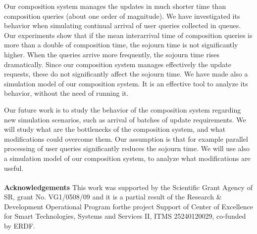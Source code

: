 \documentclass[10pt]{llncs}
\begin{document}
 Our composition system manages the updates in much shorter time than composition queries (about one order of magnitude). We have investigated its behavior when simulating continual arrival of user queries collected in queues. Our experiments show that if the mean interarrival time of composition queries is more than a double of composition time, the sojourn time is not signiﬁcantly higher. When the queries arrive more frequently, the sojourn time rises dramatically. Since our composition system manages effectively the update requests, these do not signiﬁcantly affect the sojourn time. We have made also a simulation model of our composition system. It is an effective tool to analyze its behavior, without the need of running it. 

Our future work is to study the behavior of the composition system regarding new simulation scenarios, such as arrival of batches of update requirements. We will study what are the bottlenecks of the composition system, and what modiﬁcations could overcome them. Our assumption is that for example parallel processing of user queries signiﬁcantly reduces the sojourn time. We will use also a simulation model of our composition system, to analyze what modiﬁcations are useful.
\\
\\
\scriptsize \textbf{Acknowledgements} This work was supported by the Scientiﬁc Grant Agency of SR, grant No. VG1/0508/09 and it is a partial result of the Research \& Development Operational Program forthe project Support of Center of Excellence for Smart Technologies, Systems and Services II, ITMS 25240120029, co-funded by ERDF.


%
%
\end{document}
